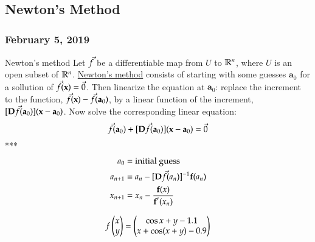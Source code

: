 \newpage
\subsection{Newton's Method}
\subsubsection*{February 5, 2019}

\begin{defn}{Newton's method}
Let $\textbf{\ensuremath{\Vec{f}}}$ be a differentiable map from $U$ to $\mathbb{R}^n$, where $U$ is an open subset of $\mathbb{R}^n$. \ul{Newton's method} consists of starting with some guesses $\bm{a}_0$ for a sollution of $\textbf{\ensuremath{\Vec{f}}}(\textbf{x})=\Vec{0}$. Then linearize the equation at $\bm{a}_0$: replace the increment to the function, $\textbf{\ensuremath{\Vec{f}}}(\textbf{x})-\textbf{\ensuremath{\Vec{f}}}(\textbf{a}_0)$, by a linear function of the increment, $[\textbf{D\ensuremath{\Vec{f}}}(\textbf{a}_0)](\textbf{x}-\textbf{a}_0)$. Now solve the corresponding linear equation:
  \begin{equation}
  	\Vec{f}(\textbf{a}_0)+[\textbf{D\ensuremath{\Vec{f}}}(\textbf{a}_0)](\textbf{x}-\textbf{a}_0)=\Vec{0}
  \end{equation}
  ***
  \begin{align*}
    a_0 &= \text{initial guess} \\
    a_{n+1} &= a_n - [\textbf{D\ensuremath{\Vec{f}}}(a_n)]^{-1} \textbf{f}(a_n) \\
    x_{n+1} &= x_n - \frac{\textbf{f}(x)}{\textbf{f}'(x_n)}
  \end{align*}
\end{defn}

\example
\[f\begin{pmatrix} x \\ y \end{pmatrix} = \begin{pmatrix} \cos x + y - 1.1 \\  x + \cos (x + y) - 0.9 \end{pmatrix}\]
